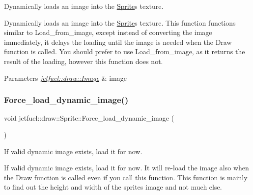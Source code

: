 Dynamically loads an image into the \hyperlink{classjetfuel_1_1draw_1_1Sprite}{Sprite}\textquotesingle{}s texture. 

Dynamically loads an image into the \hyperlink{classjetfuel_1_1draw_1_1Sprite}{Sprite}\textquotesingle{}s texture. This function functions similar to Load\+\_\+from\+\_\+image, except instead of converting the image immediately, it delays the loading until the image is needed when the Draw function is called. You should prefer to use Load\+\_\+from\+\_\+image, as it returns the result of the loading, however this function does not.


\begin{DoxyParams}{Parameters}
{\em \hyperlink{classjetfuel_1_1draw_1_1Image}{jetfuel\+::draw\+::\+Image}} & image \\
\hline
\end{DoxyParams}
\mbox{\label{classjetfuel_1_1draw_1_1Sprite_a9db9565b3e5db44676ae4a5f6c187753}} 
\subsubsection{\texorpdfstring{Force\+\_\+load\+\_\+dynamic\+\_\+image()}{Force\_load\_dynamic\_image()}}
{\footnotesize\ttfamily void jetfuel\+::draw\+::\+Sprite\+::\+Force\+\_\+load\+\_\+dynamic\+\_\+image (\begin{DoxyParamCaption}{ }\end{DoxyParamCaption})\hspace{0.3cm}{\ttfamily [inline]}}



If valid dynamic image exists, load it for now. 

If valid dynamic image exists, load it for now. It will re-\/load the image also when the Draw function is called even if you call this function. This function is mainly to find out the height and width of the sprite\textquotesingle{}s image and not much else. \mbox{\label{classjetfuel_1_1draw_1_1Sprite_aa5de791f11c4a8ee1a098963abbe4d18}} 
